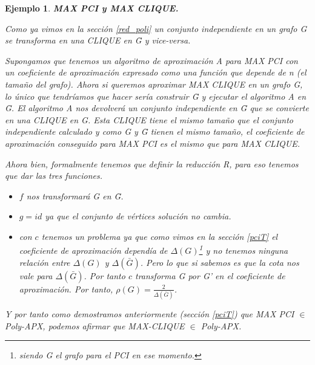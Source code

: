 \documentclass[a4paper,12pt,titlepage]{article}
\newtheorem{eje}{Ejemplo}[section]
\begin{document}
\begin{eje}

\textbf{MAX PCI y MAX CLIQUE.}

Como ya vimos en la secci\'on \ref{red_poli} un conjunto independiente en un grafo G se transforma en una CLIQUE en \=G y vice-versa.

Supongamos que tenemos un algoritmo de aproximaci\'on A para MAX PCI con un coeficiente de aproximaci\'on expresado como una funci\'on que depende de n (el tamaño del grafo). Ahora si queremos aproximar MAX CLIQUE en un grafo G, lo \'unico que tendr\'iamos que hacer ser\'ia construir \=G y ejecutar el algoritmo A en \=G. El algoritmo A nos devolver\'a un conjunto independiente en \=G que se convierte en una CLIQUE en G. Esta CLIQUE tiene el mismo tamaño que el conjunto independiente calculado y como G y \=G tienen el mismo tamaño, el coeficiente de aproximaci\'on conseguido para MAX PCI es el mismo que para MAX CLIQUE.

Ahora bien, formalmente tenemos que definir la reducci\'on R, para eso tenemos que dar las tres funciones.

\begin{itemize}
\item $f$ nos transformar\'a G en \=G.
\item $g=id$ ya que el conjunto de v\'ertices soluci\'on no cambia.
\item con $c$ tenemos un problema ya que como vimos en la secci\'on \ref{pciT} el coeficiente de aproximaci\'on depend\'ia de $\Delta(G)$\footnote{siendo G el grafo para el PCI en ese momento.} y no tenemos ninguna relaci\'on entre $\Delta(G)$ y $\Delta(\bar{G})$. Pero lo que si sabemos es que la cota nos vale para $\Delta(\bar{G})$. Por tanto $c$ transforma G por G' en el coeficiente de aproximaci\'on. Por tanto, $\rho(G) = \frac{2}{\Delta(\bar{G})}$.
\end{itemize}

Y por tanto como demostramos anteriormente (secci\'on \ref{pciT}) que MAX PCI $\in$ Poly-APX, podemos afirmar que MAX-CLIQUE $\in$ Poly-APX.

\end{eje}
\end{document}
